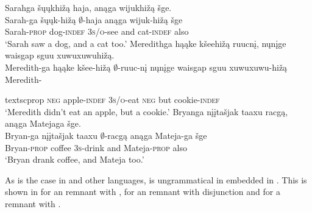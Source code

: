 \documentclass[output=paper]{LSP/langsci}
\begin{document}
{\ea\label{ex:johnson:40} 
\ea\label{ex:johnson:40a} 
\glll Sarahga šųųkhižą haja, anąga wijukhižą šge.\\
Sarah-ga šųųk-hižą $\emptyset$-haja anąga wijuk-hižą šge\\
Sarah-\textsc{prop} dog-\textsc{indef} \textsc{3s/o}-see and cat-\textsc{indef} also\\
\trans `Sarah saw a dog, and a cat too.'
 \ex\label{ex:johnson:40b}
\glll Meredithga hąąke kšeehižą ruucnį, nųnįge {waisgap sguu xuwuxuwuhižą}.\\
Meredith-ga hąąke kšee-hižą $\emptyset$-ruuc-nį nųnįge {waisgap sguu xuwuxuwu-hižą}\\
Meredith-{textsc{prop} \textsc{neg} apple-\textsc{indef} \textsc{3s/o}-eat \textsc{neg} but cookie-\textsc{indef}\\
\trans `Meredith didn't eat an apple, but a cookie.'
 \ex\label{ex:johnson:40c}
\glll Bryanga {nįįtašjak taaxu} racgą, anąga Matejaga šge.\\
Bryan-ga {nįįtašjak taaxu} $\emptyset$-racgą anąga Mateja-ga šge\\
Bryan-\textsc{prop} coffee \textsc{3s}-drink and Mateja-\textsc{prop} also\\
\trans `Bryan drank coffee, and Mateja too.'
\z
\z


As is the case in  and other languages,  is ungrammatical in embedded  in . This is shown in  for an  remnant with ,  for an  remnant with disjunction and  for a  remnant with .
 
\ea
{}
 

}}
\end{document}
